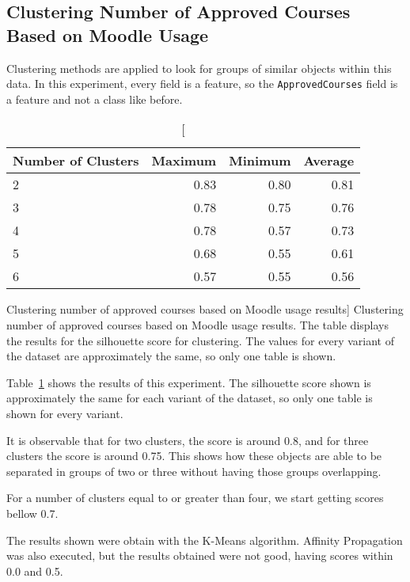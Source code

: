 \subsection{Clustering Number of Approved Courses Based on Moodle Usage}

Clustering methods are applied to look for groups of similar objects within
this data. In this experiment, every field is a feature, so the
\texttt{ApprovedCourses} field is a feature and not a class like before.

\begin{table}[h!]
    \centering

    \begin{tabular}{| l | r | r | r |}
        \hline
        \textbf{Number of Clusters} & \textbf{Maximum} & \textbf{Minimum} & \textbf{Average} \\ \hline
        2 & 0.83 & 0.80 & 0.81 \\ \hline
        3 & 0.78 & 0.75 & 0.76 \\ \hline
        4 & 0.78 & 0.57 & 0.73 \\ \hline
        5 & 0.68 & 0.55 & 0.61 \\ \hline
        6 & 0.57 & 0.55 & 0.56 \\ \hline
    \end{tabular}

    \caption
        [Clustering number of approved courses based on Moodle usage results]
        {Clustering number of approved courses based on Moodle usage results.
        The table displays the results for the silhouette score for clustering.
        The values for every variant of the dataset are approximately the same,
        so only one table is shown.}

    \label{tab:exp_004_res}
\end{table}

Table~\ref{tab:exp_004_res} shows the results of this experiment. The
silhouette score shown is approximately the same for each variant of the
dataset, so only one table is shown for every variant.

It is observable that for two clusters, the score is around 0.8, and for three
clusters the score is around 0.75. This shows how these objects are able to be
separated in groups of two or three without having those groups overlapping.

For a number of clusters equal to or greater than four, we start getting scores
bellow 0.7.

The results shown were obtain with the K-Means algorithm. Affinity Propagation
was also executed, but the results obtained were not good, having scores within
0.0 and 0.5.


